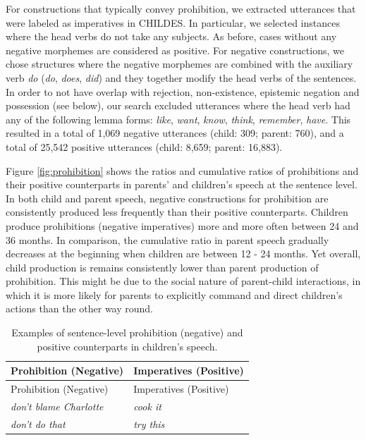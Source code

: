 \documentclass[
  english,
  man,floatsintext]{apa6}
\begin{document}
For constructions that typically convey prohibition, we extracted utterances that were labeled as imperatives in CHILDES. In particular, we selected instances where the head verbs do not take any subjects. As before, cases without any negative morphemes are considered as positive. For negative constructions, we chose structures where the negative morphemes are combined with the auxiliary verb \emph{do} (\emph{do}, \emph{does}, \emph{did}) and they together modify the head verbs of the sentences. In order to not have overlap with rejection, non-existence, epistemic negation and possession (see below), our search excluded utterances where the head verb had any of the following lemma forms: \emph{like}, \emph{want}, \emph{know}, \emph{think}, \emph{remember}, \emph{have}. This resulted in a total of 1,069 negative utterances (child: 309; parent: 760), and a total of 25,542 positive utterances (child: 8,659; parent: 16,883).

Figure \ref{fig:prohibition} shows the ratios and cumulative ratios of prohibitions and their positive counterparts in parents' and children's speech at the sentence level. In both child and parent speech, negative constructions for prohibition are consistently produced less frequently than their positive counterparts. Children produce prohibitions (negative imperatives) more and more often between 24 and 36 months. In comparison, the cumulative ratio in parent speech gradually decreases at the beginning when children are between 12 - 24 months. Yet overall, child production is remains consistently lower than parent production of prohibition. This might be due to the social nature of parent-child interactions, in which it is more likely for parents to explicitly command and direct children's actions than the other way round.

\begin{longtable}[]{@{}ll@{}}
\caption{\label{tab:prohibit} Examples of sentence-level prohibition (negative) and positive counterparts in children's speech.}\tabularnewline
\toprule
Prohibition (Negative) & Imperatives (Positive) \\
\midrule
\endfirsthead
\toprule
Prohibition (Negative) & Imperatives (Positive) \\
\midrule
\endhead
\emph{don't blame Charlotte} & \emph{cook it} \\
\emph{don't do that} & \emph{try this} \\
\bottomrule
\end{longtable}
\end{document}
